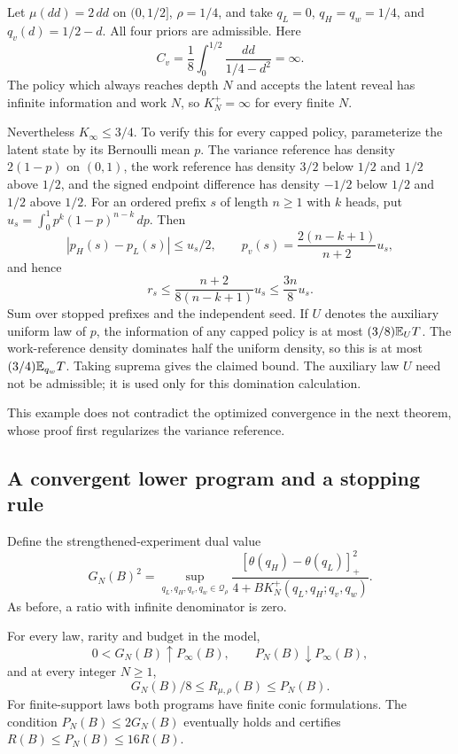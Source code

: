 \begin{remark}
Let $\mu(dd)=2\,dd$ on $(0,1/2]$, $\rho=1/4$, and take
$q_L=0$, $q_H=q_w=1/4$, and $q_v(d)=1/2-d$. All four priors are
admissible. Here
\[
 C_v=\frac18\int_0^{1/2}\frac{dd}{1/4-d^2}=\infty.
\]
The policy which always reaches depth $N$ and accepts the latent reveal
has infinite information and work $N$, so $K_N^+=\infty$ for every
finite $N$.

Nevertheless $K_\infty\le3/4$. To verify this for every capped policy,
parameterize the latent state by its Bernoulli mean $p$. The variance
reference has density $2(1-p)$ on $(0,1)$, the work reference has density
$3/2$ below $1/2$ and $1/2$ above $1/2$, and the signed endpoint
difference has density $-1/2$ below $1/2$ and $1/2$ above $1/2$.
For an ordered prefix $s$ of length $n\ge1$ with $k$ heads, put
$u_s=\int_0^1p^k(1-p)^{n-k}\,dp$. Then
\[
 |p_H(s)-p_L(s)|\le u_s/2,\qquad
 p_v(s)=\frac{2(n-k+1)}{n+2}u_s,
\]
and hence
\[
 r_s\le\frac{n+2}{8(n-k+1)}u_s\le\frac{3n}{8}u_s.
\]
Sum over stopped prefixes and the independent seed. If $U$ denotes the
auxiliary uniform law of $p$, the information of any capped policy is
at most $(3/8)\mathbb E_U T$. The work-reference density dominates half the
uniform density, so this is at most $(3/4)\mathbb E_{q_w}T$. Taking suprema
gives the claimed bound. The auxiliary law $U$ need not be admissible;
it is used only for this domination calculation.

This example does not contradict the optimized convergence in the next
theorem, whose proof first regularizes the variance reference.
\end{remark}

\subsection{A convergent lower program and a stopping rule}

Define the strengthened-experiment dual value
\begin{equation}\label{eq:genie-program}
 G_N(B)^2=
 \sup_{q_L,q_H,q_v,q_w\in\mathcal Q_\rho}
 \frac{[\theta(q_H)-\theta(q_L)]_+^2}{4+B K_N^+(q_L,q_H;q_v,q_w)}.
\end{equation}
As before, a ratio with infinite denominator is zero.

\begin{theorem}\label{thm:genie-program}
For every law, rarity and budget in the model,
\begin{equation}\label{eq:genie-program-convergence}
 0<G_N(B)\uparrow P_\infty(B),\qquad P_N(B)\downarrow P_\infty(B),
\end{equation}
and at every integer $N\ge1$,
\begin{equation}\label{eq:genie-risk-bracket}
 \boxed{\qquad G_N(B)/8\le R_{\mu,\rho}(B)\le P_N(B).\qquad}
\end{equation}
For finite-support laws both programs have finite conic formulations.
The condition $P_N(B)\le2G_N(B)$ eventually holds and certifies
$R(B)\le P_N(B)\le16R(B)$.
\end{theorem}

